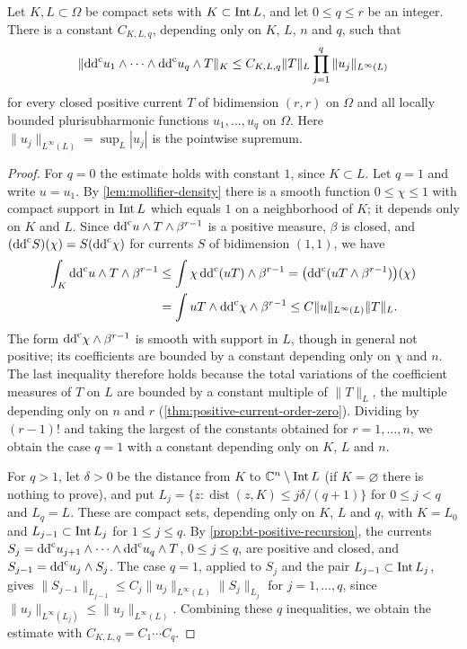 \begin{theorem}\label{thm:cln-bounded}
Let $K,L\subset\Omega$ be compact sets with $K\subset\operatorname{Int} L$, and let $0\le q\le r$ be an integer. There is a constant $C_{K,L,q}$, depending only on $K$, $L$, $n$ and $q$, such that
\[
 \|\mathrm{dd}^{\mathrm{c}} u_1\wedge\cdots\wedge\mathrm{dd}^{\mathrm{c}} u_q\wedge T\|_K
 \le C_{K,L,q}\|T\|_L\prod_{j=1}^q\|u_j\|_{L^\infty(L)}
\]
for every closed positive current $T$ of bidimension $(r,r)$ on $\Omega$ and all locally bounded plurisubharmonic functions $u_1,\ldots,u_q$ on $\Omega$. Here $\|u_j\|_{L^\infty(L)}=\sup_L|u_j|$ is the pointwise supremum.
\end{theorem}
\begin{proof}
For $q=0$ the estimate holds with constant $1$, since $K\subset L$. Let $q=1$ and write $u=u_1$. By \cref{lem:mollifier-density} there is a smooth function $0\le\chi\le1$ with compact support in $\operatorname{Int} L$ which equals $1$ on a neighborhood of $K$; it depends only on $K$ and $L$. Since $\mathrm{dd}^{\mathrm{c}} u\wedge T\wedge\beta^{r-1}$ is a positive measure, $\beta$ is closed, and $(\mathrm{dd}^{\mathrm{c}} S)(\chi)=S(\mathrm{dd}^{\mathrm{c}}\chi)$ for currents $S$ of bidimension $(1,1)$, we have
\[
 \begin{aligned}
 \int_K\mathrm{dd}^{\mathrm{c}} u\wedge T\wedge\beta^{r-1}
 &\le\int\chi\,\mathrm{dd}^{\mathrm{c}}(uT)\wedge\beta^{r-1}
 =\bigl(\mathrm{dd}^{\mathrm{c}}(uT\wedge\beta^{r-1})\bigr)(\chi)\\
 &=\int uT\wedge\mathrm{dd}^{\mathrm{c}}\chi\wedge\beta^{r-1}
 \le C\|u\|_{L^\infty(L)}\|T\|_L.
 \end{aligned}
\]
The form $\mathrm{dd}^{\mathrm{c}}\chi\wedge\beta^{r-1}$ is smooth with support in $L$, though in general not positive; its coefficients are bounded by a constant depending only on $\chi$ and $n$. The last inequality therefore holds because the total variations of the coefficient measures of $T$ on $L$ are bounded by a constant multiple of $\|T\|_L$, the multiple depending only on $n$ and $r$ (\cref{thm:positive-current-order-zero}). Dividing by $(r-1)!$ and taking the largest of the constants obtained for $r=1,\ldots,n$, we obtain the case $q=1$ with a constant depending only on $K$, $L$ and $n$.

For $q>1$, let $\delta>0$ be the distance from $K$ to $\mathbb C^n\setminus\operatorname{Int} L$ (if $K=\varnothing$ there is nothing to prove), and put $L_j=\{z:\operatorname{dist}(z,K)\le j\delta/(q+1)\}$ for $0\le j<q$ and $L_q=L$. These are compact sets, depending only on $K$, $L$ and $q$, with $K=L_0$ and $L_{j-1}\subset\operatorname{Int} L_j$ for $1\le j\le q$. By \cref{prop:bt-positive-recursion}, the currents $S_j=\mathrm{dd}^{\mathrm{c}} u_{j+1}\wedge\cdots\wedge\mathrm{dd}^{\mathrm{c}} u_q\wedge T$, $0\le j\le q$, are positive and closed, and $S_{j-1}=\mathrm{dd}^{\mathrm{c}} u_j\wedge S_j$. The case $q=1$, applied to $S_j$ and the pair $L_{j-1}\subset\operatorname{Int} L_j$, gives $\|S_{j-1}\|_{L_{j-1}}\le C_j\|u_j\|_{L^\infty(L)}\|S_j\|_{L_j}$ for $j=1,\ldots,q$, since $\|u_j\|_{L^\infty(L_j)}\le\|u_j\|_{L^\infty(L)}$. Combining these $q$ inequalities, we obtain the estimate with $C_{K,L,q}=C_1\cdots C_q$.
\end{proof}

